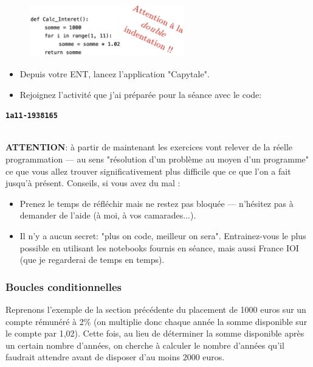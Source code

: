 \documentclass[12pt]{article}
\begin{document}
	\begin{figure}[H]
		\centering
		\includegraphics[width=0.6\textwidth]{016_CalcInteret.png}
	\end{figure}
	
	\begin{tcolorbox}[colframe=red!75!black, boxrule=2pt]
		\begin{minipage}{1\textwidth}
			\begin{itemize}				
				\item Depuis votre ENT, lancez l'application "Capytale".
				\item Rejoignez l'activité que j'ai préparée pour la séance avec le code:
			\end{itemize}
			\begin{center}
				\textbf{\texttt{1a11-1938165}}
			\end{center}
			\leavevmode
			\\
			\textbf{ATTENTION}: à partir de maintenant les exercices vont relever de la réelle programmation --- au sens "résolution d’un problème au moyen d’un programme" ce que vous allez trouver significativement plus difficile que ce que l’on a fait jusqu’à présent. Conseils, si vous avez du mal :
			\begin{itemize}				
				\item Prenez le temps de réfléchir mais ne restez pas bloqué\textperiodcentered e --- n’hésitez pas à demander de l’aide (à moi, à vos camarades...).
				\item Il n’y a aucun secret: "plus on code, meilleur on sera". Entrainez-vous le plus possible en utilisant les notebooks fournis en séance, mais aussi France IOI (que je regarderai de temps en temps).
			\end{itemize}
		\end{minipage}
	\end{tcolorbox}

	\subsubsection*{Boucles conditionnelles}
	Reprenons l’exemple de la section précédente du placement de 1000 euros sur un compte rémunéré à 2\% (on multiplie donc chaque année la somme disponible sur le compte par 1,02). Cette fois, au lieu de déterminer la somme disponible après un certain nombre d'années, on cherche à calculer le nombre d'années qu'il faudrait attendre avant de disposer d'au moins 2000 euros.
	
\end{document}
